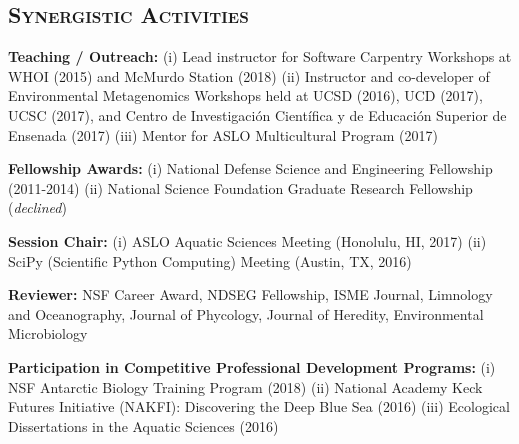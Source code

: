 \documentclass[svgnames,11pt]{article}
\begin{document}


\subsection*{\textsc{Synergistic Activities}}

\begin{bibenum}[itemsep=4pt]

    \item \textbf{Teaching / Outreach:} (i) Lead instructor for Software Carpentry Workshops at WHOI (2015) and McMurdo Station (2018) (ii) Instructor and co-developer of Environmental Metagenomics Workshops held at UCSD (2016), UCD (2017), UCSC (2017), and Centro de Investigaci\'{o}n Cient\'{i}fica y de Educaci\'{o}n Superior de Ensenada (2017) (iii) Mentor for ASLO Multicultural Program (2017)

    \item \textbf{Fellowship Awards:} (i) National Defense Science and Engineering Fellowship (2011-2014) (ii) National Science Foundation Graduate Research Fellowship (\textit{declined})

    \item \textbf{Session Chair:} (i) ASLO Aquatic Sciences Meeting (Honolulu, HI, 2017) (ii) SciPy (Scientific Python Computing) Meeting (Austin, TX, 2016)

    \item \textbf{Reviewer:} NSF Career Award, NDSEG Fellowship, ISME Journal, Limnology and Oceanography, Journal of Phycology, Journal of Heredity, Environmental Microbiology

    \item \textbf{Participation in Competitive Professional Development Programs:}
    (i) NSF Antarctic Biology Training Program (2018) (ii) National Academy Keck Futures Initiative (NAKFI): Discovering the Deep Blue Sea (2016) (iii)  Ecological Dissertations in the Aquatic Sciences (2016)

\end{bibenum}

%
%
%
\end{document}

